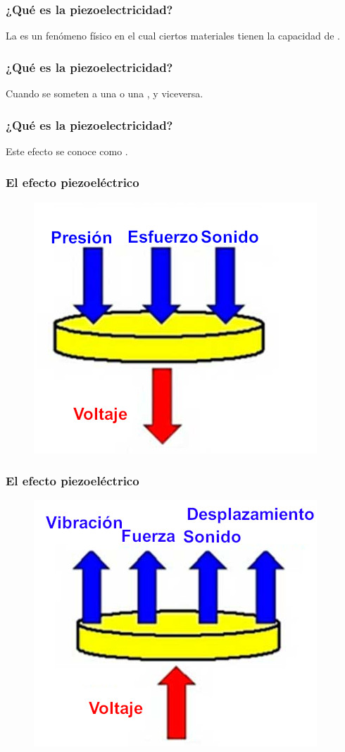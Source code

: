 \documentclass[14pt]{beamer}
\begin{document}
\begin{frame}
\frametitle{¿Qué es la piezoelectricidad?}
La  es un fenómeno físico en el cual ciertos materiales tienen la capacidad de .
\end{frame}
\begin{frame}
\frametitle{¿Qué es la piezoelectricidad?}
Cuando se someten a una  o una , y viceversa.
\end{frame}
\begin{frame}
\frametitle{¿Qué es la piezoelectricidad?}
Este efecto se conoce como .
\end{frame}    
\begin{frame}
\frametitle{El efecto piezoeléctrico}
\vspace*{-1cm}
\begin{figure}
    \centering
    \includegraphics[scale=0.5]{Imagenes/Piezoelectricidad_04b.jpg}
\end{figure}
\end{frame}
\begin{frame}
\frametitle{El efecto piezoeléctrico}
\vspace*{-1cm}
\begin{figure}
    \centering
    \includegraphics[scale=0.5]{Imagenes/Piezoelectricidad_04c.jpg}
\end{figure}
\end{frame}
\end{document}

